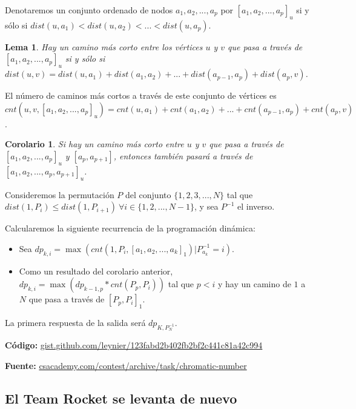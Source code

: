 \documentclass[12pt]{article}
\newcommand{\nl}{\vspace{0.3cm}}
\newtheorem{lemma}{Lema}
\newtheorem{corollary}{Corolario}
\begin{document}
Denotaremos un conjunto ordenado de nodos $a_1, a_2, ..., a_p$ por $[a_1, a_2, ..., a_p]_u$ si y sólo si $dist(u, a_1) < dist(u, a_2) < ... < dist(u, a_p)$.

\begin{lemma}
	Hay un camino más corto entre los vértices $u$ y $v$ que pasa a través de $[a_1, a_2, ..., a_p]_u$ si y sólo si $dist(u, v) = dist(u, a_1) + dist(a_1, a_2) + ... + dist(a_{p-1}, a_p) + dist(a_p, v)$.
\end{lemma}

El número de caminos más cortos a través de este conjunto de vértices es $cnt(u, v, [a_1, a_2, ..., a_p]_u) = cnt(u, a_1) + cnt(a_1, a_2) + ... + cnt(a_{p-1}, a_p) + cnt(a_p, v)$.

\begin{corollary}
	Si hay un camino más corto entre $u$ y $v$ que pasa a través de $[a_1, a_2, ..., a_p]_u$ y $[a_p,a_{p+1}]$, entonces también pasará a través de $[a_1, a_2, ..., a_p, a_{p+1}]_u$.
\end{corollary}

Consideremos la permutación $P$ del conjunto $\{1,2,3,...,N\}$ tal que $dist(1, P_i) \leqslant dist(1, P_{i+1})\ \forall i \in \{1,2,...,N-1\}$, y sea $P^{-1}$ el inverso.

\nl

Calcularemos la siguiente recurrencia de la programación dinámica:

\begin{itemize}
	\item Sea $dp_{k,i} = \max ( cnt(1, P_i, [a_1, a_2, ..., a_k]_1) | P_{a_k}^{-1} = i )$.
	\item Como un resultado del corolario anterior, $dp_{k,i} = \max ( dp_{k-1,p} * cnt(P_p, P_i))$ tal que $p < i$ y hay un camino de $1$ a $N$ que pasa a través de $[P_p, P_i]_1$.
\end{itemize}

La primera respuesta de la salida será $dp_{K,P_N^{-1}}$.

\nl

\textbf{Código:} \href{https://gist.github.com/leynier/123fabd2b402fb2bf2c441c81a42c994}{gist.github.com/leynier/123fabd2b402fb2bf2c441c81a42c994}

\nl

\textbf{Fuente:} \href{https://csacademy.com/contest/archive/task/chromatic-number}{csacademy.com/contest/archive/task/chromatic-number}

\subsection{El Team Rocket se levanta de nuevo}
\end{document}
